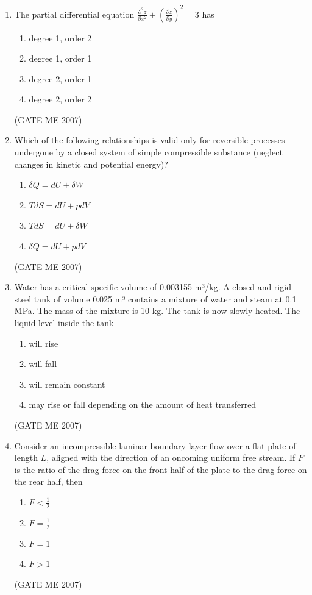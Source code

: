 \documentclass[journal]{IEEEtran}
\begin{document}
\begin{enumerate}
\item The partial differential equation $ \frac{\partial^2 z}{\partial x^2} + \left( \frac{\partial z}{\partial y} \right)^2 = 3 $ has
\begin{multicols}{2}
\begin{enumerate}
\item degree 1, order 2
\item degree 1, order 1
\item degree 2, order 1
\item degree 2, order 2
\end{enumerate}
\end{multicols}
\hfill (GATE ME 2007)

\item Which of the following relationships is valid only for reversible processes undergone by a closed system of simple compressible substance (neglect changes in kinetic and potential energy)?
\begin{multicols}{2}
\begin{enumerate}
\item $ \delta Q = dU + \delta W $
\item $ T dS = dU + p dV $
\item $ T dS = dU + \delta W $
\item $ \delta Q = dU + p dV $
\end{enumerate}
\end{multicols}
\hfill (GATE ME 2007)

\item Water has a critical specific volume of 0.003155 m³/kg. A closed and rigid steel tank of volume 0.025 m³ contains a mixture of water and steam at 0.1 MPa. The mass of the mixture is 10 kg. The tank is now slowly heated. The liquid level inside the tank
\begin{enumerate}
\item will rise
\item will fall
\item will remain constant
\item may rise or fall depending on the amount of heat transferred
\end{enumerate}
\hfill (GATE ME 2007)

\item Consider an incompressible laminar boundary layer flow over a flat plate of length $ L $, aligned with the direction of an oncoming uniform free stream. If $ F $ is the ratio of the drag force on the front half of the plate to the drag force on the rear half, then
\begin{multicols}{4}
\begin{enumerate}
\item $ F < \frac{1}{2} $
\item $ F = \frac{1}{2} $
\item $ F = 1 $
\item $ F > 1 $
\end{enumerate}
\end{multicols}
\hfill (GATE ME 2007)


\end{enumerate}
\end{document}

